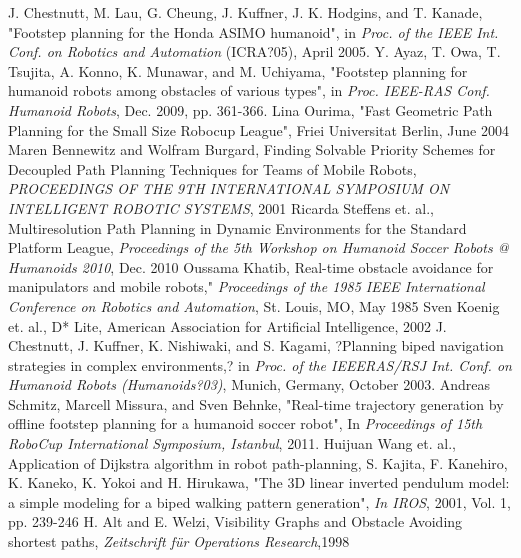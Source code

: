 \documentclass[letterpaper, 10 pt, conference]{ieeeconf}  %
\begin{document}
\begin{thebibliography}{99}
J. Chestnutt, M. Lau, G. Cheung, J. Kuffner, J. K. Hodgins, and
T. Kanade, "Footstep planning for the Honda ASIMO humanoid", in
\emph{Proc. of the IEEE Int. Conf. on Robotics and Automation} (ICRA?05),
April 2005.
 Y. Ayaz, T. Owa, T. Tsujita, A. Konno, K. Munawar, and M. Uchiyama,
"Footstep planning for humanoid robots among obstacles of various
types", in \emph{Proc. IEEE-RAS Conf. Humanoid Robots}, Dec. 2009, pp. 361-366.
 Lina Ourima, "Fast Geometric Path Planning for the Small Size Robocup League", Friei Universitat Berlin, June 2004
 Maren Bennewitz and Wolfram Burgard, Finding Solvable Priority Schemes for Decoupled Path Planning Techniques for Teams of Mobile Robots, \emph{PROCEEDINGS OF THE 9TH INTERNATIONAL SYMPOSIUM ON INTELLIGENT ROBOTIC SYSTEMS}, 2001
 Ricarda Steffens et. al., Multiresolution Path Planning in Dynamic Environments for the Standard Platform League, \emph{Proceedings of the 5th Workshop on Humanoid Soccer Robots @ Humanoids 2010}, Dec. 2010
 Oussama Khatib, Real-time obstacle avoidance
for manipulators and mobile robots," \emph{Proceedings
of the 1985 IEEE International Conference
on Robotics and Automation}, St. Louis, MO, May
1985
 Sven Koenig et. al., D* Lite, American Association for Artificial Intelligence, 2002
 J. Chestnutt, J. Kuffner, K. Nishiwaki, and S. Kagami, ?Planning biped
navigation strategies in complex environments,? in \emph{Proc. of the IEEERAS/RSJ
Int. Conf. on Humanoid Robots (Humanoids?03)}, Munich,
Germany, October 2003.
 Andreas Schmitz, Marcell Missura, and Sven Behnke, "Real-time trajectory generation
by offline footstep planning for a humanoid soccer robot",  In \emph{Proceedings of
15th RoboCup International Symposium, Istanbul}, 2011.
 Huijuan Wang  et. al., Application of Dijkstra algorithm in robot
path-planning, 
 S. Kajita, F. Kanehiro, K. Kaneko, K. Yokoi and H. Hirukawa, "The 3D linear inverted
pendulum model: a simple modeling for a biped walking pattern generation", \emph{In
IROS}, 2001, Vol. 1, pp. 239-246
 H. Alt and E. Welzi, Visibility Graphs and Obstacle Avoiding shortest paths, \emph{Zeitschrift für Operations Research},1998


\end{thebibliography}
\end{document}
